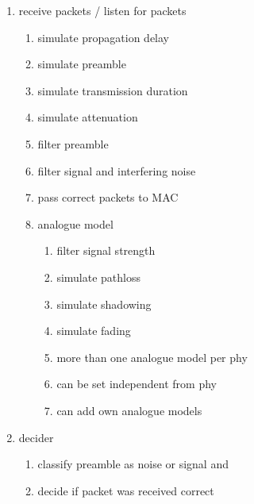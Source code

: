 \begin{enumerate}
\begin{enumerate}
	\end{enumerate}
 \item receive packets / listen for packets
		\begin{enumerate}
		\item simulate propagation delay \label{rcvSimDelay}
		\item simulate preamble \label{rcvSimPreamble}
		\item simulate transmission duration \label{rcvSimDuration}
		\item simulate attenuation \label{rcvSimAttenuation}
		\item filter preamble \label{rcvFilterPreamble}
		\item filter signal and interfering noise \label{rcvFilterSignals}
		\item pass correct packets to MAC \label{rcvPassToMAC}
		\item analogue model
			\begin{enumerate}
			\item filter signal strength \label{analogueFilter}
			\item simulate pathloss \label{analogueSimPathloss}
			\item simulate shadowing \label{analogueSimShadowing}
			\item simulate fading \label{analogueSimFading}
			\item more than one analogue model per phy \label{analogueMulti}
			\item can be set independent from phy \label{analogueIndependent}
			\item can add own analogue models \label{analogueExtensible}
			\end{enumerate}
		\end{enumerate}
		\item decider
			\begin{enumerate}
			\item classify preamble as noise or signal  and \label{rcvClassify}
			\item decide if packet was received correct \label{rcvIsCorrect}

\end{enumerate}
\end{enumerate}
